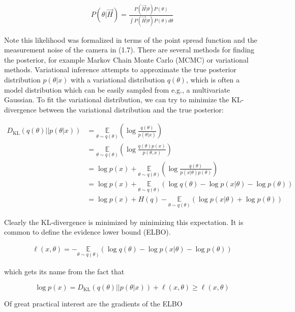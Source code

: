 \documentclass{ucetd}
\begin{document}
\begin{align}
P(\theta|\vec{H}) = \frac{P(\vec{H}|\theta)P(\theta)}{\int P(\vec{H}|\theta)P(\theta) d\theta}
\end{align}

Note this likelihood was formalized in terms of the point spread function and the measurement noise of the camera in (1.7). There are several methods for finding the posterior, for example Markov Chain Monte Carlo (MCMC) or variational methods. Variational inference attempts to approximate the true posterior distribution $p(\theta|x)$ with a variational distribution $q(\theta)$, which is often a model distribution which can be easily sampled from e.g., a multivariate Gaussian. To fit the variational distribution, we can try to minimize the KL-divergence between the variational distribution and the true posterior:

\begin{align*}
D_{\mathrm{KL}}(q(\theta)||p(\theta|x)) &= \underset{{\theta \sim q(\theta)}}{\mathbb{E}}\left(\log\frac{q(\theta)}{p(\theta|x)}\right)\\
&=  \underset{{\theta \sim q(\theta)}}{\mathbb{E}}\left(\log\frac{q(\theta)p(x)}{p(\theta,x)}\right)\\
&=  \log p(x) + \underset{{\theta \sim q(\theta)}}{\mathbb{E}}\left(\log\frac{q(\theta)}{p(x|\theta)p(\theta)}\right)\\
&= \log p(x) + \underset{{\theta \sim q(\theta)}}{\mathbb{E}}\left(\log q(\theta) - \log p(x|\theta) - \log p(\theta) \right)\\
&= \log p(x) + H(q) -\underset{{\theta \sim q(\theta)}}{\mathbb{E}}\left(\log p(x|\theta) + \log p(\theta) \right)
\end{align*}

Clearly the KL-divergence is minimized by minimizing this expectation. It is common to define the evidence lower bound (ELBO).

\begin{align}
\ell(x,\theta) = - \underset{{\theta \sim q(\theta)}}{\mathbb{E}}\left(\log q(\theta) - \log p(x|\theta) - \log p(\theta) \right)
\end{align}

which gets its name from the fact that

\begin{equation*}
\log p(x) = D_{\mathrm{KL}}(q(\theta)||p(\theta|x)) + \ell(x,\theta) \geq \ell(x,\theta)
\end{equation*}

Of great practical interest are the gradients of the ELBO
\end{document}
